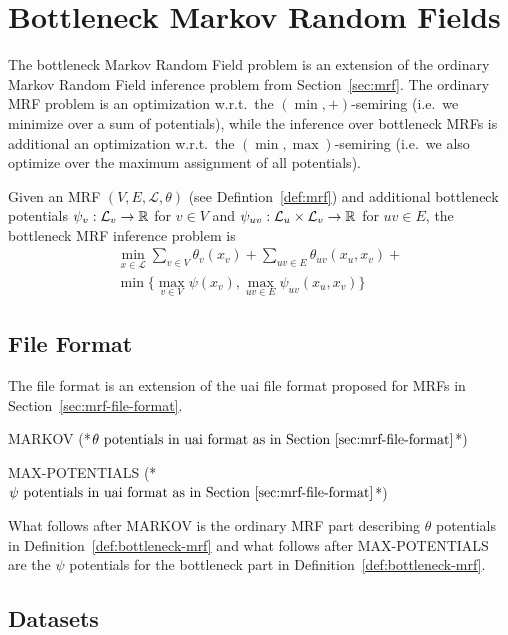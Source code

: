 \section{Bottleneck Markov Random Fields}
The bottleneck Markov Random Field problem is an extension of the ordinary Markov Random Field inference problem from Section~\ref{sec:mrf}.
The ordinary MRF problem is an optimization w.r.t.\ the $(\min,+)$-semiring (i.e.\ we minimize over a sum of potentials), while the inference over bottleneck MRFs is additional an optimization w.r.t.\ the $(\min,\max)$-semiring (i.e.\ we also optimize over the maximum assignment of all potentials).

\begin{definition}
\label{def:bottleneck-mrf}
Given an MRF $(V,E,\mathcal{L},\theta)$ (see Defintion~\ref{def:mrf}) and additional bottleneck potentials $\psi_v : \mathcal{L}_v \rightarrow \mathbb{R}$ for $v \in V$ and $\psi_{uv} : \mathcal{L}_u \times \mathcal{L}_v \rightarrow \mathbb{R}$ for $uv \in E$, the bottleneck MRF inference problem is
\begin{multline}
\min_{x \in \mathcal{L}}  \sum_{v \in V} \theta_v(x_v) + \sum_{uv \in E} \theta_{uv}(x_u,x_v) + \\ \min\{\max_{v \in V} \psi(x_v), \max_{uv \in E} \psi_{uv}(x_u,x_v) \}
\end{multline}
\end{definition}

\subsection{File Format}
The file format is an extension of the uai file format proposed for MRFs in Section~\ref{sec:mrf-file-format}.

\begin{fileformat}
MARKOV
(*$\theta \text{ potentials in uai format as in Section~\ref{sec:mrf-file-format}}$*)

MAX-POTENTIALS
(*$\psi \text{ potentials in uai format as in Section~\ref{sec:mrf-file-format}}$*)
\end{fileformat}
What follows after MARKOV is the ordinary MRF part describing $\theta$ potentials in Definition~\ref{def:bottleneck-mrf} and what follows after MAX-POTENTIALS are the $\psi$ potentials for the bottleneck part in Definition~\ref{def:bottleneck-mrf}.

\subsection{Datasets}
